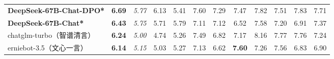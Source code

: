 \begin{table}[t]
{\begin{tabular}{@{}l|c|ccc|ccccccc@{}}
\textbf{DeepSeek-67B-Chat-DPO*}              & \textbf{6.69}                     & \multicolumn{1}{c|}{\textit{5.77}}                                   & 6.13                                            & 5.41                                            & \multicolumn{1}{c|}{7.60}                                            & 7.29                                            & 7.47                                            & 7.82                                            & 7.51                                            & 7.83                                            & 7.71                     \\                       
\textbf{DeepSeek-67B-Chat*}              & \textbf{6.43}                     & \multicolumn{1}{c|}{\textit{5.75}}                                   & 5.71                                            & 5.79                                            & \multicolumn{1}{c|}{7.11}                                            & 7.12                                            & 6.52                                            & 7.58                                            & 7.20                                            & 6.91                                            & 7.37                                            \\
chatglm-turbo（智谱清言）         & \textbf{6.24}                     & \multicolumn{1}{c|}{\textit{5.00}}                                   & 4.74                                            & 5.26                                            & \multicolumn{1}{c|}{7.49}                                            & 6.82                                            & 7.17                                            & 8.16                                            & 7.77                                            & 7.76                                            & 7.24                                            \\
erniebot-3.5（文心一言）          & \textbf{6.14}                     & \multicolumn{1}{c|}{\textit{5.15}}                                   & 5.03                                            & 5.27                                            & \multicolumn{1}{c|}{7.13}                                            & 6.62                                            & \textbf{7.60}                                            & 7.26                                            & 7.56                                            & 6.83                                            & 6.90                                            \\

\end{tabular}}
\end{table}
